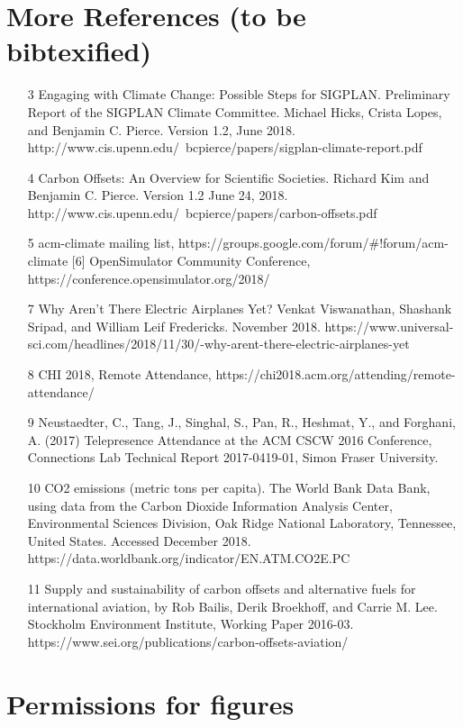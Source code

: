\documentclass[12pt]{article}
\begin{document}
\section*{More References (to be bibtexified)}
\begin{itemize}
\item 
[3] Engaging with Climate Change: Possible Steps for SIGPLAN. Preliminary Report of the SIGPLAN Climate Committee.  Michael Hicks,​ ​Crista Lopes, and​ ​Benjamin C. Pierce. Version 1.2, June 2018. http://www.cis.upenn.edu/~bcpierce/papers/sigplan-climate-report.pdf
\item [4] Carbon Offsets: An Overview for Scientific Societies.  Richard Kim and ​Benjamin C. Pierce. Version 1.2 June 24, 2018.  http://www.cis.upenn.edu/~bcpierce/papers/carbon-offsets.pdf
\item[5] acm-climate mailing list, https://groups.google.com/forum/\#!forum/acm-climate
[6] OpenSimulator Community Conference, https://conference.opensimulator.org/2018/
\item [7] Why Aren’t There Electric Airplanes Yet? Venkat Viswanathan, Shashank Sripad, and William Leif Fredericks. November 2018. https://www.universal-sci.com/headlines/2018/11/30/-why-arent-there-electric-airplanes-yet
\item [8] CHI 2018, Remote Attendance, https://chi2018.acm.org/attending/remote-attendance/
\item [9] Neustaedter, C., Tang, J., Singhal, S., Pan, R., Heshmat, Y., and Forghani, A. (2017) Telepresence Attendance at the ACM CSCW 2016 Conference, Connections Lab Technical Report 2017-0419-01, Simon Fraser University.
\item [10] CO2 emissions (metric tons per capita). The World Bank Data Bank, using data from the Carbon Dioxide Information Analysis Center, Environmental Sciences Division, Oak Ridge National Laboratory, Tennessee, United States. Accessed December 2018. https://data.worldbank.org/indicator/EN.ATM.CO2E.PC
\item [11]  Supply and sustainability of carbon offsets and alternative fuels for international aviation, by
Rob Bailis, Derik Broekhoff, and Carrie M. Lee.  Stockholm Environment Institute, Working Paper 2016-03. https://www.sei.org/publications/carbon-offsets-aviation/			
\end{itemize}


\ifdraft
\newpage
\section*{Permissions for figures}
\end{document}
